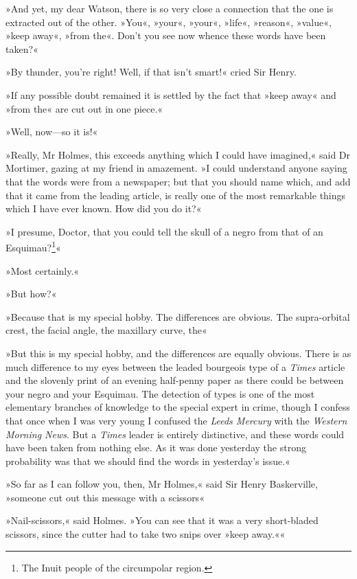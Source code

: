 »And yet, my dear Watson, there is so very close a connection that the one is extracted out of the other. »You«, »your«, »your«, »life«, »reason«, »value«, »keep away«, »from the«. Don't you see now whence these words have been taken?«

»By thunder, you're right! Well, if that isn't smart!« cried Sir Henry.

»If any possible doubt remained it is settled by the fact that »keep away« and »from the« are cut out in one piece.«

»Well, now\allowbreak---\allowbreak so it is!«

»Really, Mr Holmes, this exceeds anything which I could have imagined,« said Dr Mortimer, gazing at my friend in amazement. »I could understand anyone saying that the words were from a newspaper; but that you should name which, and add that it came from the leading article, is really one of the most remarkable things which I have ever known. How did you do it?«

»I presume, Doctor, that you could tell the skull of a negro from that of an Esquimau?\footnote{The Inuit people of the circumpolar region.}«

»Most certainly.«

»But how?«

»Because that is my special hobby. The differences are obvious. The supra-orbital crest, the facial angle, the maxillary curve, the\longdash«

»But this is my special hobby, and the differences are equally obvious. There is as much difference to my eyes between the leaded bourgeois type of a \textit{Times} article and the slovenly print of an evening half-penny paper as there could be between your negro and your Esquimau. The detection of types is one of the most elementary branches of knowledge to the special expert in crime, though I confess that once when I was very young I confused the \textit{Leeds Mercury} with the \textit{Western Morning News}. But a \textit{Times} leader is entirely distinctive, and these words could have been taken from nothing else. As it was done yesterday the strong probability was that we should find the words in yesterday's issue.«

»So far as I can follow you, then, Mr Holmes,« said Sir Henry Baskerville, »someone cut out this message with a scissors\longdash «

»Nail-scissors,« said Holmes. »You can see that it was a very short-bladed scissors, since the cutter had to take two snips over »keep away.««

